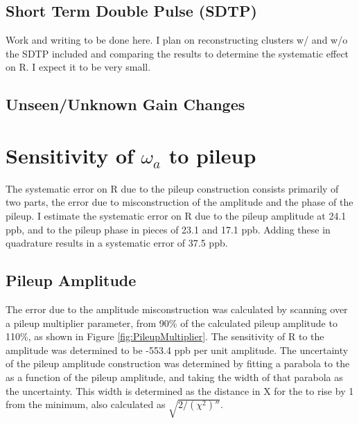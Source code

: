 	\subsection{Short Term Double Pulse (SDTP)}

		Work and writing to be done here. I plan on reconstructing clusters w/ and w/o the SDTP included and comparing the results to determine the systematic effect on R. I expect it to be very small.

	\subsection{Unseen/Unknown Gain Changes}



\section{Sensitivity of \texorpdfstring{$\omega_{a}$}{} to pileup}
\label{Sec:SystematicPileup}

	The systematic error on R due to the pileup construction consists primarily of two parts, the error due to misconstruction of the amplitude and the phase of the pileup. I estimate the systematic error on R due to the pileup amplitude at 24.1 ppb, and to the pileup phase in pieces of 23.1 and 17.1 ppb. Adding these in quadrature results in a systematic error of 37.5 ppb.

	\subsection{Pileup Amplitude}

		The error due to the amplitude misconstruction was calculated by scanning over a pileup multiplier parameter, from 90\% of the calculated pileup amplitude to 110\%, as shown in Figure \ref{fig:PileupMultiplier}. The sensitivity of R to the amplitude was determined to be -553.4 ppb per unit amplitude. The uncertainty of the pileup amplitude construction was determined by fitting a parabola to the \chisq as a function of the pileup amplitude, and taking the width of that parabola as the uncertainty. This width is determined as the distance in X for the \chisq to rise by 1 from the minimum, also calculated as $\sqrt{2/(\chi^{2})''}$.

